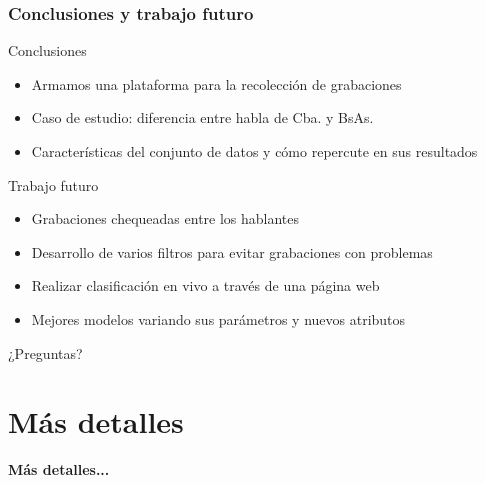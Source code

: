 \documentclass[mathserif]{beamer}%
\begin{document}
\begin{frame}
	\frametitle{Conclusiones y trabajo futuro}
	
	{\Large Conclusiones}
	
	\begin{itemize}
		\item Armamos una plataforma para la recolección de grabaciones
		\item Caso de estudio: diferencia entre habla de Cba. y BsAs.
		\item Características del conjunto de datos y cómo repercute en sus resultados 
	\end{itemize}
	
	\pause
	
	{\Large Trabajo futuro}
	
	\begin{itemize}
		\item Grabaciones chequeadas entre los hablantes
		
		\pause
		
		\item Desarrollo de varios filtros para evitar grabaciones con problemas
		
		\pause
		
		\item Realizar clasificación en vivo a través de una página web
		
		\pause
		
		\item Mejores modelos variando sus parámetros y nuevos atributos 
		
	\end{itemize}
\end{frame}

\begin{frame}
	\begin{center}
		{\Large ¿Preguntas?}
	\end{center}
\end{frame}

\setcounter{finalframe}{\value{framenumber}}


\section{Más detalles}

\begin{frame}[noframenumbering]
	\begin{center}
		\textbf{Más detalles...}
	\end{center}
\end{frame}
\end{document}
